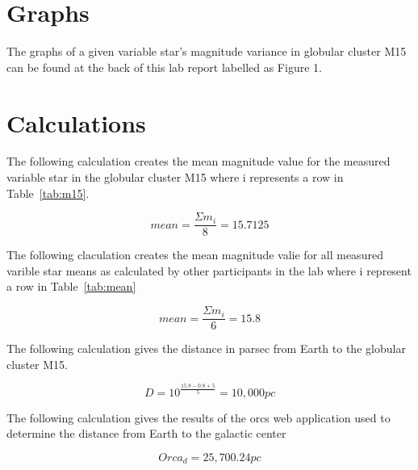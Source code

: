 \documentclass{article}
\begin{document}

\section{Graphs}

The graphs of a given variable star's magnitude variance in globular cluster M15
can be found at the back of this lab report labelled as Figure 1.


\section{Calculations}
\label{sec:calc}

The following calculation creates the mean magnitude value for the measured variable star in
the globular cluster M15 where i represents a row in Table~\ref{tab:m15}.

\begin{equation}
\label{calc:m}
mean = \frac{\Sigma m_{i}}{8} = 15.7125
\end{equation}

The following claculation creates the mean magnitude valie for all measured varible star
means as calculated by other participants in the lab where i represent a row in
Table~\ref{tab:mean}

\begin{equation}
\label{calc:mm}
mean = \frac{\Sigma m_{i}}{6} = 15.8
\end{equation}

The following calculation gives the distance in parsec from Earth to the globular cluster
M15.

\begin{equation}
\label{calc:d1}
D = 10^{\frac{15.8 - 0.8 + 5}{5}} = 10,000 pc
\end{equation}

The following calculation gives the results of the orcs web application used to determine
the distance from Earth to the galactic center

\begin{equation}
\label{calc:d2}
Orca_{d} = 25,700.24 pc
\end{equation}
\end{document}
